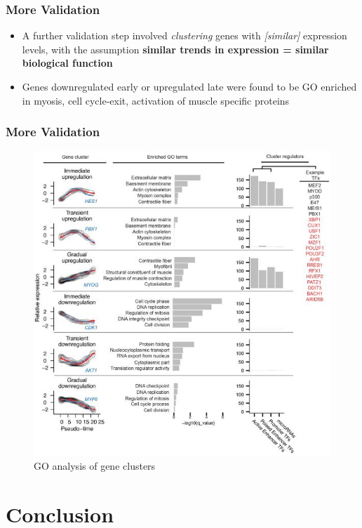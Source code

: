 \documentclass[10pt]{beamer}
\begin{document}
\begin{frame}
	\frametitle{More Validation}

\begin{itemize}
	\item A further validation step involved \emph{clustering} genes with \emph{[similar] } expression levels, with the assumption \textbf{similar trends in expression = similar biological function }
	\item Genes downregulated early or upregulated late were found to be GO enriched in myosis, cell cycle-exit, activation of muscle specific proteins
\end{itemize}


\end{frame}


\begin{frame}
		\frametitle{More Validation}
		\begin{figure}
			\includegraphics[scale=0.72]{images/expt3}
			\caption{GO analysis of gene clusters}
		\end{figure}
\end{frame}

\section{Conclusion}
\end{document}
